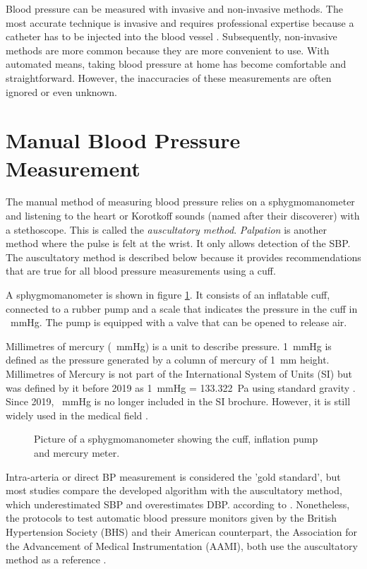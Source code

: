 Blood pressure can be measured with invasive and non-invasive methods. The most accurate technique is invasive and requires professional expertise because a catheter has to be injected into the blood vessel \citep{Boron2012}. Subsequently, non-invasive methods are more common because they are more convenient to use. With automated means, taking blood pressure at home has become comfortable and straightforward. However, the inaccuracies of these measurements are often ignored or even unknown.

\section{Manual Blood Pressure Measurement}
The manual method of measuring blood pressure relies on a sphygmomanometer and listening to the heart or Korotkoff sounds (named after their discoverer) with a stethoscope. This is called the \emph{auscultatory method}. \emph{Palpation} is another method where the pulse is felt at the wrist. It only allows detection of the SBP. The auscultatory method is described below because it provides recommendations that are true for all blood pressure measurements using a cuff.

A sphygmomanometer is shown in figure \ref{fig:sphy}. It consists of an inflatable cuff, connected to a rubber pump and a scale that indicates the pressure in the cuff in \SI{}{\mmHg}. The pump is equipped with a valve that can be opened to release air.

Millimetres of mercury (\SI{}{\mmHg}) is a unit to describe pressure. \SI{1}{\mmHg} is defined as the pressure generated by a column of mercury of \SI{1}{\mm} height. Millimetres of Mercury is not part of the International System of Units (SI) but was defined by it before 2019 as \SI{1}{\mmHg} = \SI{133.322}{\Pa} using standard gravity \citep{SI2006}. Since 2019, \SI{}{\mmHg} is no longer included in the SI brochure. However, it is still widely used in the medical field \citep{Prazak2020}.

\begin{figure}[h]
\centering
\caption{Picture of a sphygmomanometer showing the cuff, inflation pump and mercury meter.}
\label{fig:sphy}
\end{figure}

Intra-arteria or direct BP measurement is considered the 'gold standard', but most studies compare the developed algorithm with the auscultatory method, which underestimated SBP and overestimates DBP. according to \citet{Sapinski1996}. Nonetheless, the protocols to test automatic blood pressure monitors given by the British Hypertension Society (BHS) and their American counterpart, the Association for the Advancement of Medical Instrumentation (AAMI), both use the auscultatory method as a reference \citep{Jazbinsek2010,OBrien1993,AAMI2013}.

